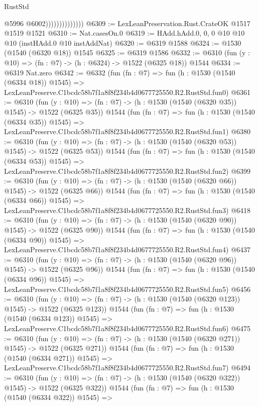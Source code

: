 \begin{lexlean}{RustStd}
\begin{coremodule}
                                @5996
                                @6002))))))))))))))
@6309 := LexLeanPreservation.Rust.CrateOK @1517 @1519 @1521
@6310 := Nat.casesOn.{0}
@6319 := HAdd.hAdd.{0, 0, 0} @10 @10 @10 (instHAdd.{0} @10 instAddNat)
@6320 := @6319 @1588
@6324 := @1530 (@1540 (@6320 @18)) @1545
@6325 := @6319 @1586
@6332 := @6310 (fun (y : @10) => (fn : @7) -> (h : @6324) -> @1522 (@6325 @18)) @1544
@6334 := @6319 Nat.zero
@6342 := @6332
    (fun (fn : @7) =>
    fun (h : @1530 (@1540 (@6334 @18)) @1545) =>
    LexLeanPreserve.C1bcdc58b7f1a8f8f234b4d0677725550.R2.RustStd.fun0)
@6361 := @6310
    (fun (y : @10) => (fn : @7) -> (h : @1530 (@1540 (@6320 @35)) @1545) -> @1522 (@6325 @35))
    @1544
    (fun (fn : @7) =>
    fun (h : @1530 (@1540 (@6334 @35)) @1545) =>
    LexLeanPreserve.C1bcdc58b7f1a8f8f234b4d0677725550.R2.RustStd.fun1)
@6380 := @6310
    (fun (y : @10) => (fn : @7) -> (h : @1530 (@1540 (@6320 @53)) @1545) -> @1522 (@6325 @53))
    @1544
    (fun (fn : @7) =>
    fun (h : @1530 (@1540 (@6334 @53)) @1545) =>
    LexLeanPreserve.C1bcdc58b7f1a8f8f234b4d0677725550.R2.RustStd.fun2)
@6399 := @6310
    (fun (y : @10) => (fn : @7) -> (h : @1530 (@1540 (@6320 @66)) @1545) -> @1522 (@6325 @66))
    @1544
    (fun (fn : @7) =>
    fun (h : @1530 (@1540 (@6334 @66)) @1545) =>
    LexLeanPreserve.C1bcdc58b7f1a8f8f234b4d0677725550.R2.RustStd.fun3)
@6418 := @6310
    (fun (y : @10) => (fn : @7) -> (h : @1530 (@1540 (@6320 @90)) @1545) -> @1522 (@6325 @90))
    @1544
    (fun (fn : @7) =>
    fun (h : @1530 (@1540 (@6334 @90)) @1545) =>
    LexLeanPreserve.C1bcdc58b7f1a8f8f234b4d0677725550.R2.RustStd.fun4)
@6437 := @6310
    (fun (y : @10) => (fn : @7) -> (h : @1530 (@1540 (@6320 @96)) @1545) -> @1522 (@6325 @96))
    @1544
    (fun (fn : @7) =>
    fun (h : @1530 (@1540 (@6334 @96)) @1545) =>
    LexLeanPreserve.C1bcdc58b7f1a8f8f234b4d0677725550.R2.RustStd.fun5)
@6456 := @6310
    (fun (y : @10) => (fn : @7) -> (h : @1530 (@1540 (@6320 @123)) @1545) -> @1522 (@6325 @123))
    @1544
    (fun (fn : @7) =>
    fun (h : @1530 (@1540 (@6334 @123)) @1545) =>
    LexLeanPreserve.C1bcdc58b7f1a8f8f234b4d0677725550.R2.RustStd.fun6)
@6475 := @6310
    (fun (y : @10) => (fn : @7) -> (h : @1530 (@1540 (@6320 @271)) @1545) -> @1522 (@6325 @271))
    @1544
    (fun (fn : @7) =>
    fun (h : @1530 (@1540 (@6334 @271)) @1545) =>
    LexLeanPreserve.C1bcdc58b7f1a8f8f234b4d0677725550.R2.RustStd.fun7)
@6494 := @6310
    (fun (y : @10) => (fn : @7) -> (h : @1530 (@1540 (@6320 @322)) @1545) -> @1522 (@6325 @322))
    @1544
    (fun (fn : @7) =>
    fun (h : @1530 (@1540 (@6334 @322)) @1545) =>

\end{coremodule}
\end{lexlean}
